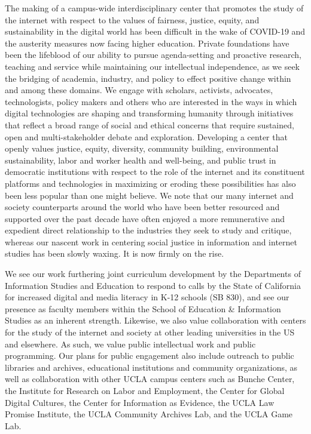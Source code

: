 \documentclass[11pt]{article}
\begin{document}
The making of a campus-wide interdisciplinary center that promotes the study of the internet with respect to the values of fairness, justice, equity, and sustainability in the digital world has been difficult in the wake of COVID-19 and the austerity measures now facing higher education.  Private foundations have been the lifeblood of our ability to pursue agenda-setting and proactive research, teaching and service while maintaining our intellectual independence, as we seek the bridging of academia, industry, and policy to effect positive change within and among these domains. We engage with scholars, activists, advocates, technologists, policy makers and others who are interested in the ways in which digital technologies are shaping and transforming humanity through initiatives that reflect a broad range of social and ethical concerns that require sustained, open and multi-stakeholder debate and exploration.
Developing a center that openly values justice, equity, diversity, community building, environmental sustainability, labor and worker health and well-being, and public trust in democratic institutions with respect to the role of the internet and its constituent platforms and technologies in maximizing or eroding these possibilities has also been less popular than one might believe. We note that our many internet and society counterparts around the world who have been better resourced and supported over the past decade have often enjoyed a more remunerative and expedient direct relationship to the industries they seek to study and critique, whereas our nascent work in centering social justice in information and internet studies has been slowly waxing. It is now firmly on the rise.

We see our work furthering joint curriculum development by the Departments of Information Studies and Education to respond to calls by the State of California for increased digital and media literacy in K-12 schools (SB 830), and see our presence as faculty members within the School of Education \& Information Studies as an inherent strength.  Likewise, we also value collaboration with centers for the study of the internet and society at other leading universities in the US and elsewhere. As such, we value public intellectual work and  public programming. Our plans for public engagement also include outreach to public libraries and archives, educational institutions and community organizations,  as well as collaboration with other UCLA campus centers such as Bunche Center, the Institute for Research on Labor and Employment, the Center for Global Digital Cultures, the Center for Information as Evidence, the UCLA Law Promise Institute, the UCLA Community Archives Lab, and the UCLA Game Lab.
\end{document}
